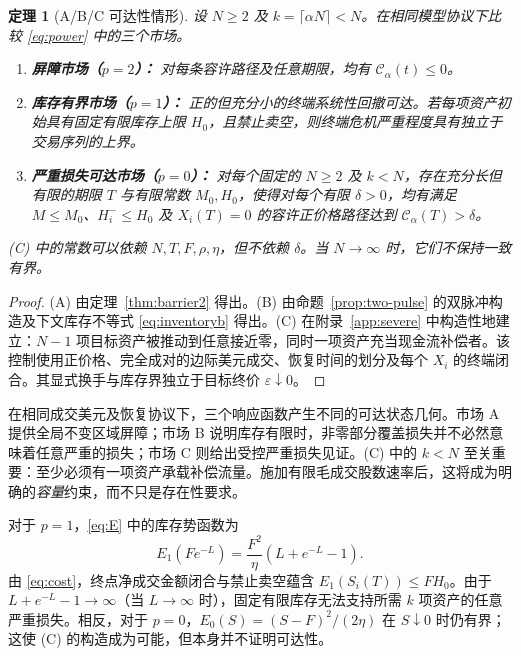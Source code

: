 \documentclass[11pt]{article}
\numberwithin{equation}{section}
\newtheorem{theorem}{定理}[section]
\theoremstyle{definition}
\theoremstyle{remark}
\newcommand{\Cris}{\mathcal{C}}
\begin{document}
\begin{theorem}[A/B/C 可达性情形]\label{thm:ABC}
设 $N\ge2$ 及 $k=\lceil\alpha N\rceil<N$。在相同模型协议下比较 \eqref{eq:power} 中的三个市场。
\begin{enumerate}[label=\textup{(\Alph*)},leftmargin=2em,itemsep=0.15em]
\item \textbf{屏障市场（$p=2$）：} 对每条容许路径及任意期限，均有 $\Cris_\alpha(t)\le0$。
\item \textbf{库存有界市场（$p=1$）：} 正的但充分小的终端系统性回撤可达。若每项资产初始具有固定有限库存上限 $H_0$，且禁止卖空，则终端危机严重程度具有独立于交易序列的上界。
\item \textbf{严重损失可达市场（$p=0$）：} 对每个固定的 $N\ge2$ 及 $k<N$，存在充分长但有限的期限 $T$ 与有限常数 $M_0,H_0$，使得对\emph{每个}有限 $\delta>0$，均有满足 $M\le M_0$、$H_i^-\le H_0$ 及 $X_i(T)=0$ 的容许正价格路径达到 $\Cris_\alpha(T)>\delta$。
\end{enumerate}
(C) 中的常数可以依赖 $N,T,F,\rho,\eta$，但不依赖 $\delta$。当 $N\to\infty$ 时，它们不保持一致有界。
\end{theorem}
\begin{proof}
(A) 由定理~\ref{thm:barrier2} 得出。(B) 由命题~\ref{prop:two-pulse} 的双脉冲构造及下文库存不等式 \eqref{eq:inventoryb} 得出。(C) 在附录~\ref{app:severe} 中构造性地建立：$N-1$ 项目标资产被推动到任意接近零，同时一项资产充当现金流补偿者。该控制使用正价格、完全成对的边际美元成交、恢复时间的划分及每个 $X_i$ 的终端闭合。其显式换手与库存界独立于目标终价 $\varepsilon\downarrow0$。
\end{proof}

在相同成交美元及恢复协议下，三个响应函数产生不同的可达状态几何。市场 A 提供全局不变区域屏障；市场 B 说明库存有限时，非零部分覆盖损失并不必然意味着任意严重的损失；市场 C 则给出受控严重损失见证。(C) 中的 $k<N$ 至关重要：至少必须有一项资产承载补偿流量。施加有限毛成交股数速率后，这将成为明确的\emph{容量}约束，而不只是存在性要求。

对于 $p=1$，\eqref{eq:E} 中的库存势函数为
\begin{equation}\label{eq:inventoryb}
E_1(Fe^{-L})=\frac{F^2}{\eta}\left(L+e^{-L}-1\right).
\end{equation}
由 \eqref{eq:cost}，终点净成交金额闭合与禁止卖空蕴含 $E_1(S_i(T))\le FH_0$。由于 $L+e^{-L}-1\to\infty$（当 $L\to\infty$ 时），固定有限库存无法支持所需 $k$ 项资产的任意严重损失。相反，对于 $p=0$，$E_0(S)=(S-F)^2/(2\eta)$ 在 $S\downarrow0$ 时仍有界；这使 (C) 的构造成为可能，但本身并不证明可达性。
\end{document}
